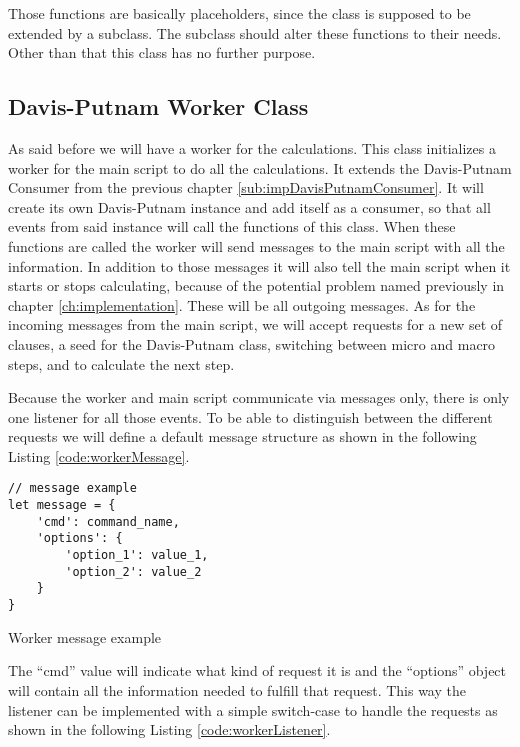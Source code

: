 Those functions are basically placeholders, since the class is supposed to be extended by a subclass. The subclass should alter these functions to their needs. Other than that this class has no further purpose.

\subsection{Davis-Putnam Worker Class}
\label{sub:impDavisPutnamWorker}
As said before we will have a worker for the calculations. This class initializes a worker for the main script to do all the calculations. It extends the Davis-Putnam Consumer from the previous chapter \ref{sub:impDavisPutnamConsumer}. It will create its own Davis-Putnam instance and add itself as a consumer, so that all events from said instance will call the functions of this class. When these functions are called the worker will send messages to the main script with all the information. In addition to those messages it will also tell the main script when it starts or stops calculating, because of the potential problem named previously in chapter \ref{ch:implementation}. These will be all outgoing messages. As for the incoming messages from the main script, we will accept requests for a new set of clauses, a seed for the Davis-Putnam class, switching between micro and macro steps, and to calculate the next step.

Because the worker and main script communicate via messages only, there is only one listener for all those events. To be able to distinguish between the different requests we will define a default message structure as shown in the following Listing \ref{code:workerMessage}.

\begin{listing}[h!]
\begin{verbatim}
// message example
let message = {
    'cmd': command_name,
    'options': {
        'option_1': value_1,
        'option_2': value_2
    }
}
\end{verbatim}
    \caption{Worker message example}
    \label{code:workerMessage}
\end{listing}

The ``cmd'' value will indicate what kind of request it is and the ``options'' object will contain all the information needed to fulfill that request. This way the listener can be implemented with a simple switch-case to handle the requests as shown in the following Listing \ref{code:workerListener}.

